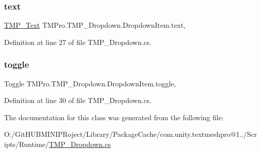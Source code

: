 \subsubsection{\texorpdfstring{text}{text}}
{\footnotesize\ttfamily \mbox{\hyperlink{class_t_m_pro_1_1_t_m_p___text}{T\+M\+P\+\_\+\+Text}} T\+M\+Pro.\+T\+M\+P\+\_\+\+Dropdown.\+Dropdown\+Item.\+text\hspace{0.3cm}{\ttfamily [get]}, {\ttfamily [set]}}



Definition at line 27 of file T\+M\+P\+\_\+\+Dropdown.\+cs.

\mbox{\label{class_t_m_pro_1_1_t_m_p___dropdown_1_1_dropdown_item_aca93e992665dcb739782e24b79b3d935}} 
\subsubsection{\texorpdfstring{toggle}{toggle}}
{\footnotesize\ttfamily Toggle T\+M\+Pro.\+T\+M\+P\+\_\+\+Dropdown.\+Dropdown\+Item.\+toggle\hspace{0.3cm}{\ttfamily [get]}, {\ttfamily [set]}}



Definition at line 30 of file T\+M\+P\+\_\+\+Dropdown.\+cs.



The documentation for this class was generated from the following file\+:\begin{DoxyCompactItemize}
\item 
O\+:/\+Git\+H\+U\+B\+M\+I\+N\+I\+P\+Roject/\+Library/\+Package\+Cache/com.\+unity.\+textmeshpro@1../\+Scripts/\+Runtime/\mbox{\hyperlink{_t_m_p___dropdown_8cs}{T\+M\+P\+\_\+\+Dropdown.\+cs}}\end{DoxyCompactItemize}
